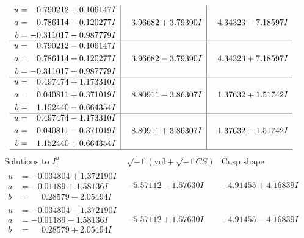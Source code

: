 \documentclass[1p]{elsarticle_modified}
\theoremstyle{definition}
\newcommand{\I}{\sqrt{-1}}
\begin{document}
$$\begin{array}{c|c|c}
\begin{aligned}
u &= \phantom{-}0.790212 + 0.106147 I \\
a &= \phantom{-}0.786114 - 0.120277 I \\
b &= -0.311017 - 0.987779 I\end{aligned}
 & \phantom{-}3.96682 + 3.79390 I & \phantom{-}4.34323 - 7.18597 I \\ \hline\begin{aligned}
u &= \phantom{-}0.790212 - 0.106147 I \\
a &= \phantom{-}0.786114 + 0.120277 I \\
b &= -0.311017 + 0.987779 I\end{aligned}
 & \phantom{-}3.96682 - 3.79390 I & \phantom{-}4.34323 + 7.18597 I \\ \hline\begin{aligned}
u &= \phantom{-}0.497474 + 1.173310 I \\
a &= \phantom{-}0.040811 + 0.371019 I \\
b &= \phantom{-}1.152440 - 0.664354 I\end{aligned}
 & \phantom{-}8.80911 - 3.86307 I & \phantom{-}1.37632 + 1.51742 I \\ \hline\begin{aligned}
u &= \phantom{-}0.497474 - 1.173310 I \\
a &= \phantom{-}0.040811 - 0.371019 I \\
b &= \phantom{-}1.152440 + 0.664354 I\end{aligned}
 & \phantom{-}8.80911 + 3.86307 I & \phantom{-}1.37632 - 1.51742 I\\
 \hline 
 \end{array}$$\newpage$$\begin{array}{c|c|c}  
\text{Solutions to }I^u_{1}& \I (\text{vol} + \sqrt{-1}CS) & \text{Cusp shape}\\
 \hline 
\begin{aligned}
u &= -0.034804 + 1.372190 I \\
a &= -0.01189 + 1.58136 I \\
b &= \phantom{-}0.28579 - 2.05494 I\end{aligned}
 & -5.57112 - 1.57630 I & -4.91455 + 4.16839 I \\ \hline\begin{aligned}
u &= -0.034804 - 1.372190 I \\
a &= -0.01189 - 1.58136 I \\
b &= \phantom{-}0.28579 + 2.05494 I\end{aligned}
 & -5.57112 + 1.57630 I & -4.91455 - 4.16839 I \\ \hline\begin{aligned}

\end{aligned}
\end{array}$$
\end{document}
